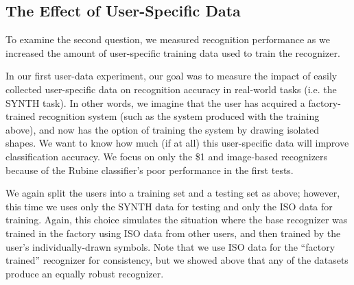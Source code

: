 \documentclass{egpubl}
\begin{document}
\subsection{The Effect of User-Specific Data}

To examine the second question, we measured recognition performance as we increased the amount of user-specific training data used to train the recognizer.  

In our first user-data experiment, our goal was to measure the impact of easily collected user-specific data on recognition accuracy in real-world tasks (i.e. the SYNTH task).  In other words, we imagine that the user has acquired a factory-trained recognition system (such as the system produced with the training above), and now has the option of training the system by drawing isolated shapes.  We want to know how much (if at all) this user-specific data will improve classification accuracy.  We focus on only the \$1 and image-based recognizers because of the Rubine classifier's poor performance in the first tests.  

We again split the users into a training set and a testing set as above; however, this time we uses only the SYNTH data for testing and only the ISO data for training.  Again, this choice simulates the situation where the base recognizer was trained in the factory using ISO data from other users, and then trained by the user's individually-drawn symbols.  Note that we use ISO data for the ``factory trained'' recognizer for consistency, but we showed above that any of the datasets produce an equally robust recognizer.
\end{document}
